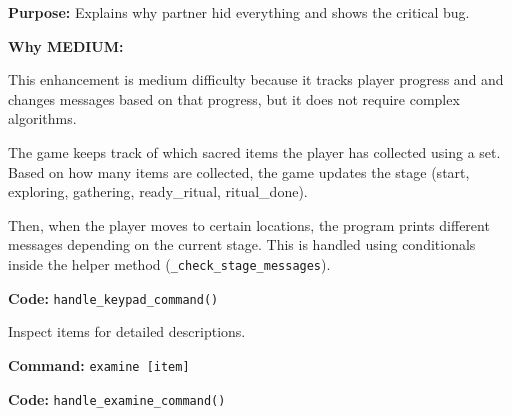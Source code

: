 \documentclass[12pt]{article}
\begin{document}
\textbf{Purpose:} Explains why partner hid everything and shows the critical bug.

\textbf{Why MEDIUM:}

This enhancement is medium difficulty because it tracks player progress and and changes messages based on that progress, but it does not require complex algorithms.

The game keeps track of which sacred items the player has collected using a set. Based on how many items are collected, the game updates the stage (start, exploring, gathering, ready\_ritual, ritual\_done).

Then, when the player moves to certain locations, the program prints different messages depending on the current stage. This is handled using conditionals inside the helper method (\texttt{\_check\_stage\_messages}).


\textbf{Code:} \texttt{handle\_keypad\_command()}


Inspect items for detailed descriptions.

\textbf{Command:} \texttt{examine [item]}

\textbf{Code:} \texttt{handle\_examine\_command()}
\end{document}
